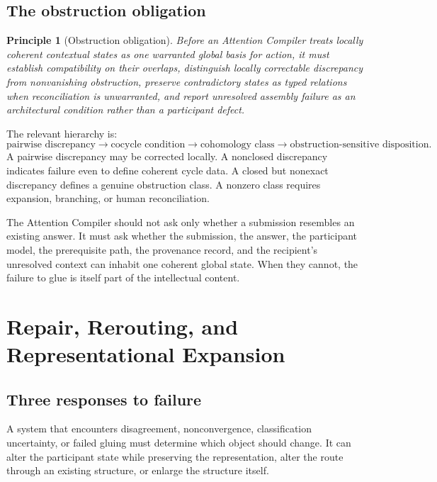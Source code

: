 \documentclass[11pt]{article}
\newtheorem{principle}[definition]{Principle}
\theoremstyle{definition}
\begin{document}
\subsection{The obstruction obligation}

\begin{principle}[Obstruction obligation]
Before an Attention Compiler treats locally coherent contextual states as one warranted global basis for action, it must establish compatibility on their overlaps, distinguish locally correctable discrepancy from nonvanishing obstruction, preserve contradictory states as typed relations when reconciliation is unwarranted, and report unresolved assembly failure as an architectural condition rather than a participant defect.
\end{principle}

The relevant hierarchy is:
\[
\text{pairwise discrepancy}
\longrightarrow
\text{cocycle condition}
\longrightarrow
\text{cohomology class}
\longrightarrow
\text{obstruction-sensitive disposition}.
\]
A pairwise discrepancy may be corrected locally. A nonclosed discrepancy indicates failure even to define coherent cycle data. A closed but nonexact discrepancy defines a genuine obstruction class. A nonzero class requires expansion, branching, or human reconciliation.

The Attention Compiler should not ask only whether a submission resembles an existing answer. It must ask whether the submission, the answer, the participant model, the prerequisite path, the provenance record, and the recipient's unresolved context can inhabit one coherent global state. When they cannot, the failure to glue is itself part of the intellectual content.

\section{Repair, Rerouting, and Representational Expansion}

\subsection{Three responses to failure}

A system that encounters disagreement, nonconvergence, classification uncertainty, or failed gluing must determine which object should change. It can alter the participant state while preserving the representation, alter the route through an existing structure, or enlarge the structure itself.
\end{document}
